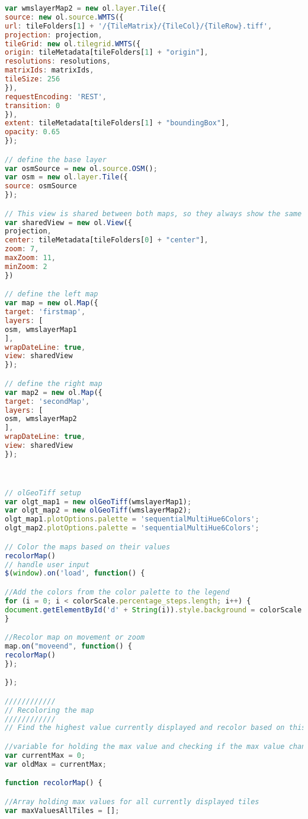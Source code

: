 \begin{lstlisting}[language=JavaScript, caption={The JavaScript for the map}, label= VoresJS,escapechar=|]
var wmslayerMap2 = new ol.layer.Tile({
source: new ol.source.WMTS({
url: tileFolders[1] + '/{TileMatrix}/{TileCol}/{TileRow}.tiff',
projection: projection,
tileGrid: new ol.tilegrid.WMTS({
origin: tileMetadata[tileFolders[1] + "origin"],
resolutions: resolutions,
matrixIds: matrixIds,
tileSize: 256
}),
requestEncoding: 'REST',
transition: 0
}),
extent: tileMetadata[tileFolders[1] + "boundingBox"],
opacity: 0.65
});

// define the base layer
var osmSource = new ol.source.OSM();
var osm = new ol.layer.Tile({
source: osmSource
});

// This view is shared between both maps, so they always show the same
var sharedView = new ol.View({
projection,
center: tileMetadata[tileFolders[0] + "center"],
zoom: 7,
maxZoom: 11,
minZoom: 2
})

// define the left map
var map = new ol.Map({
target: 'firstmap',
layers: [
osm, wmslayerMap1
],
wrapDateLine: true,
view: sharedView
});

// define the right map
var map2 = new ol.Map({
target: 'secondMap',
layers: [
osm, wmslayerMap2
],
wrapDateLine: true,
view: sharedView
});



// olGeoTiff setup
var olgt_map1 = new olGeoTiff(wmslayerMap1);
var olgt_map2 = new olGeoTiff(wmslayerMap2);
olgt_map1.plotOptions.palette = 'sequentialMultiHue6Colors';
olgt_map2.plotOptions.palette = 'sequentialMultiHue6Colors';

// Color the maps based on their values
recolorMap()
// handle user input
$(window).on('load', function() {

//Add the colors from the color palette to the legend
for (i = 0; i < colorScale.percentage_steps.length; i++) {
document.getElementById('d' + String(i)).style.background = colorScale.color_steps[i]
}

//Recolor map on movement or zoom
map.on("moveend", function() {
recolorMap()
});

});

////////////
// Recoloring the map
////////////
// Find the highest value currently displayed and recolor based on this

//variable for holding the max value and checking if the max value changes
var currentMax = 0;
var oldMax = currentMax;

function recolorMap() {

//Array holding max values for all currently displayed tiles
var maxValuesAllTiles = [];


\end{lstlisting}
